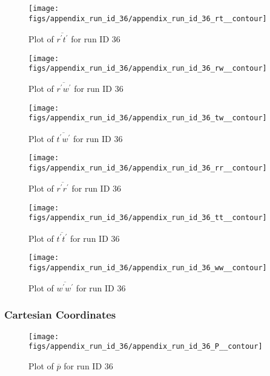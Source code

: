 \begin{figure}[H]
\centering
\texttt{[image: figs/appendix\_run\_id\_36/appendix\_run\_id\_36\_rt\_\_contour]}
\caption{Plot of $\overline{r^\prime t^\prime}$ for run ID 36}
\label{fig:appendix_run_id_36_rt__contour}
\end{figure}


\begin{figure}[H]
\centering
\texttt{[image: figs/appendix\_run\_id\_36/appendix\_run\_id\_36\_rw\_\_contour]}
\caption{Plot of $\overline{r^\prime w^\prime}$ for run ID 36}
\label{fig:appendix_run_id_36_rw__contour}
\end{figure}


\begin{figure}[H]
\centering
\texttt{[image: figs/appendix\_run\_id\_36/appendix\_run\_id\_36\_tw\_\_contour]}
\caption{Plot of $\overline{t^\prime w^\prime}$ for run ID 36}
\label{fig:appendix_run_id_36_tw__contour}
\end{figure}


\begin{figure}[H]
\centering
\texttt{[image: figs/appendix\_run\_id\_36/appendix\_run\_id\_36\_rr\_\_contour]}
\caption{Plot of $\overline{r^\prime r^\prime}$ for run ID 36}
\label{fig:appendix_run_id_36_rr__contour}
\end{figure}


\begin{figure}[H]
\centering
\texttt{[image: figs/appendix\_run\_id\_36/appendix\_run\_id\_36\_tt\_\_contour]}
\caption{Plot of $\overline{t^\prime t^\prime}$ for run ID 36}
\label{fig:appendix_run_id_36_tt__contour}
\end{figure}


\begin{figure}[H]
\centering
\texttt{[image: figs/appendix\_run\_id\_36/appendix\_run\_id\_36\_ww\_\_contour]}
\caption{Plot of $\overline{w^\prime w^\prime}$ for run ID 36}
\label{fig:appendix_run_id_36_ww__contour}
\end{figure}


\subsubsection{Cartesian Coordinates}
\begin{figure}[H]
\centering
\texttt{[image: figs/appendix\_run\_id\_36/appendix\_run\_id\_36\_P\_\_contour]}
\caption{Plot of $\overline{p}$ for run ID 36}
\label{fig:appendix_run_id_36_P__contour}
\end{figure}


